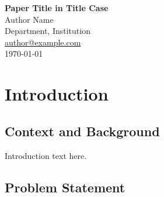 \documentclass[12pt, a4paper]{article}
\newcommand{\keywords}[1]{\textit{Keywords}: #1}
\begin{document}
\begin{titlepage}
\begin{center}
\vspace*{2in}

{\LARGE \textbf{Paper Title in Title Case}} \\[0.5in]

{\large Author Name} \\[0.1in]
{\normalsize Department, Institution} \\[0.1in]
{\normalsize \href{mailto:author@example.com}{author@example.com}} \\[0.5in]

{\normalsize \today}

\end{center}
\end{titlepage}

\begin{abstract}
\noindent
Abstract text goes here. Include background, purpose, method, findings, and implications in a single paragraph without indent.

\vspace{6pt}
\noindent
\keywords{keyword1, keyword2, keyword3, keyword4, keyword5}
\end{abstract}

%

\newpage

\section{Introduction}

\subsection{Context and Background}
Introduction text here.

\subsection{Problem Statement}
\end{document}
